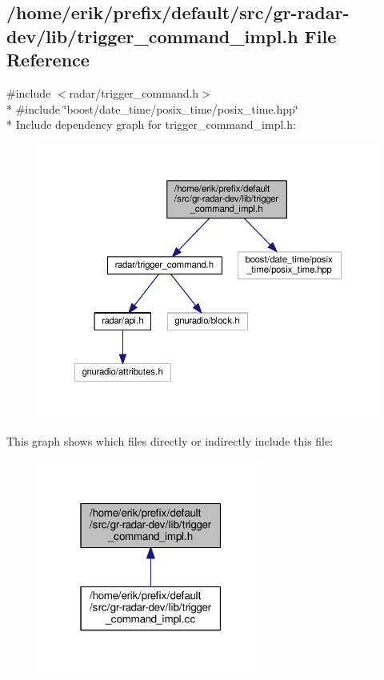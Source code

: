 \subsection{/home/erik/prefix/default/src/gr-\/radar-\/dev/lib/trigger\+\_\+command\+\_\+impl.h File Reference}
\label{trigger__command__impl_8h}
{\ttfamily \#include $<$radar/trigger\+\_\+command.\+h$>$}\\*
{\ttfamily \#include \char`\"{}boost/date\+\_\+time/posix\+\_\+time/posix\+\_\+time.\+hpp\char`\"{}}\\*
Include dependency graph for trigger\+\_\+command\+\_\+impl.\+h\+:
\nopagebreak
\begin{figure}[H]
\begin{center}
\leavevmode
\includegraphics[width=350pt]{d4/d5a/trigger__command__impl_8h__incl}
\end{center}
\end{figure}
This graph shows which files directly or indirectly include this file\+:
\nopagebreak
\begin{figure}[H]
\begin{center}
\leavevmode
\includegraphics[width=211pt]{d6/dba/trigger__command__impl_8h__dep__incl}
\end{center}
\end{figure}
